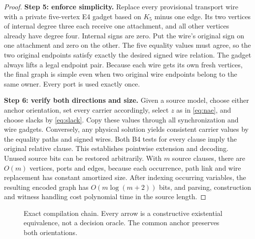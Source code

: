 \documentclass[11pt,letterpaper]{article}
\theoremstyle{definition}
\newcommand{\NAE}{\operatorname{NAE}}
\begin{document}
\begin{proof}
\textbf{Step 5: enforce simplicity.} Replace every provisional transport wire with a private five-vertex E4 gadget based on \(K_5\) minus one edge. Its two vertices of internal degree three each receive one attachment, and all other vertices already have degree four. Internal signs are zero. Put the wire's original sign on one attachment and zero on the other. The five equality values must agree, so the two original endpoints satisfy exactly the desired signed wire relation. The gadget always lifts a legal endpoint pair. Because each wire gets its own fresh vertices, the final graph is simple even when two original wire endpoints belong to the same owner. Every port is used exactly once.

\textbf{Step 6: verify both directions and size.} Given a source model, choose either anchor orientation, set every carrier accordingly, select \(z\) as in \eqref{eq:nae}, and choose slacks by \eqref{eq:slack}. Copy these values through all synchronization and wire gadgets. Conversely, any physical solution yields consistent carrier values by the equality paths and signed wires. Both B4 tests for every clause imply the original relative clause. This establishes pointwise extension and decoding. Unused source bits can be restored arbitrarily. With \(m\) source clauses, there are \(O(m)\) vertices, ports and edges, because each occurrence, path link and wire replacement has constant amortized size. After indexing occurring variables, the resulting encoded graph has \(O(m\log(m+2))\) bits, and parsing, construction and witness handling cost polynomial time in the source length.\end{proof}

\begin{figure}[htbp]
\centering
{}
\caption{Exact compilation chain. Every arrow is a constructive existential equivalence, not a decision oracle. The common anchor preserves both orientations.}
\label{fig:compiler}
\end{figure}
\end{document}
